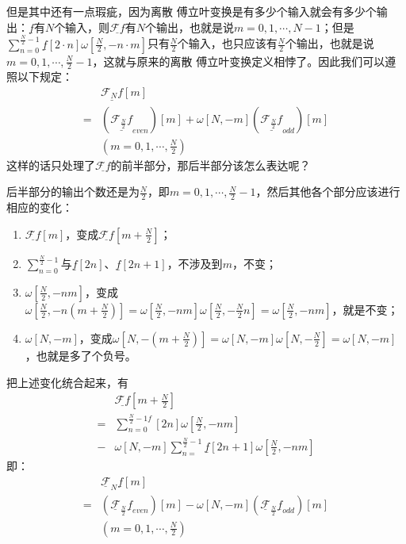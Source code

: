 但是其中还有一点瑕疵，因为离散 傅立叶变换是有多少个输入就会有多少个输出：$\underline{f}$有$N$个输入，则$\underline{\mathcal{F}f}$有$N$个输出，也就是说$m =0,1,\cdots,N-1$；但是$\sum\limits_{n=0}^{\frac{N}{2}-1}\underline{f}[2\cdot n]\omega[\frac{N}{2},-n\cdot m]$只有$\frac{N}{2}$个输入，也只应该有$\frac{N}{2}$个输出，也就是说$m= 0,1,\cdots,\frac{N}{2}-1$，这就与原来的离散 傅立叶变换定义相悖了。因此我们可以遵照以下规定：
\begin{align*}
	  & \underline{\mathcal{F}_N f}[m]                                                                                                             \\
	= & \left( \underline{\mathcal{F}_{\frac{N}{2}}f}_{even} \right)[m]+\omega[N,-m]\left( \underline{\mathcal{F}_{\frac{N}{2}}f}_{odd} \right)[m] \\
	  & (m=0,1, \cdots,\frac{N}{2})
\end{align*}
这样的话只处理了$\underline{\mathcal{F}f}$的前半部分，那后半部分该怎么表达呢？

后半部分的输出个数还是为$\frac{N}{2}$，即$m=0,1,\cdots,\frac{N}{2}-1$，然后其他各个部分应该进行相应的变化：
\begin{enumerate}
	\item $\underline{\mathcal{F}f}[m]$，变成$\underline{\mathcal{F}f}[m+\frac{N}{2}]$；
	\item $\sum_{n=0}^{\frac{N}{2}-1}$与$\underline{f}[2n]$、$\underline{f}[2n+1]$，不涉及到$m$，不变；
	\item $\omega[\frac{N}{2},-nm]$，变成$\omega[\frac{N}{2},-n(m+\frac{N}{2})] = \omega[\frac{N}{2},-nm]\omega[\frac{N}{2},-\frac{N}{2}n] = \omega[\frac{N}{2},-nm]$，就是不变；
	\item $\omega[N,-m]$，变成$\omega[N,-(m+\frac{N}{2})] = \omega[N,-m]\omega[N,-\frac{N}{2}] = \omega[N,-m]$，也就是多了个负号。
\end{enumerate}

把上述变化统合起来，有
\begin{align*}
	  & \underline{\mathcal{F}f}[m+\frac{N}{2}]                                         \\
	= & \sum_{n=0}^{\frac{N}{2}-1f}[2n]\omega[\frac{N}{2},-nm]                          \\
	- & \omega[N,-m]\sum_{n=}^{\frac{N}{2}-1}\underline{f}[2n+1]\omega[\frac{N}{2},-nm]
\end{align*}
即：
\begin{align*}
	  & \underline{\mathcal{F}}_N\underline{f}[m]                                                                                                                          \\
	= & \left( \underline{\mathcal{F}}_{\frac{N}{2}}\underline{f}_{even} \right)[m]-\omega[N,-m]\left( \underline{\mathcal{F}}_{\frac{N}{2}}\underline{f}_{odd} \right)[m] \\
	  & (m=0,1, \cdots,\frac{N}{2})
\end{align*}
